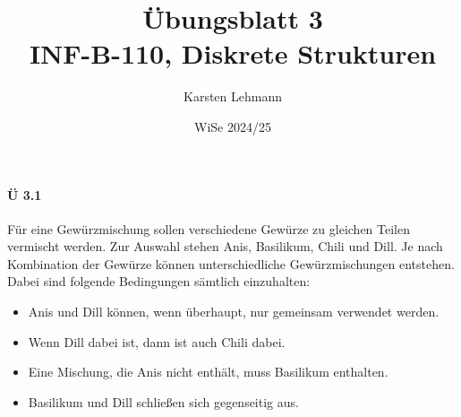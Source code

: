 \documentclass{scrreprt}
\author{Karsten Lehmann}
\date{WiSe 2024/25}
\title{Übungsblatt 3\\INF-B-110, Diskrete Strukturen}
\begin{document}
\paragraph{Ü 3.1} Für eine Gewürzmischung sollen verschiedene Gewürze zu gleichen
Teilen vermischt werden.
Zur Auswahl stehen Anis, Basilikum, Chili und Dill.
Je nach Kombination der Gewürze können unterschiedliche Gewürzmischungen entstehen.
Dabei sind folgende Bedingungen sämtlich einzuhalten:
\begin{itemize}
\item Anis und Dill können, wenn überhaupt, nur gemeinsam verwendet werden.
\item Wenn Dill dabei ist, dann ist auch Chili dabei.
\item Eine Mischung, die Anis nicht enthält, muss Basilikum enthalten.
\item Basilikum und Dill schließen sich gegenseitig aus.
\end{itemize}
\end{document}
